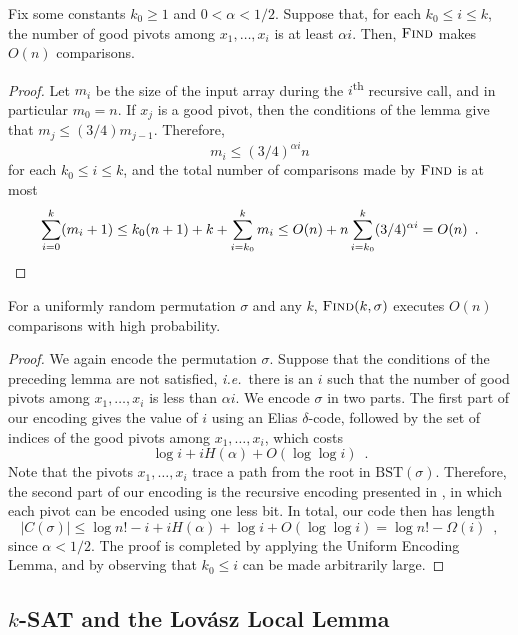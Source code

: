 \documentclass{patmorin}
\begin{document}
\begin{lem}
  Fix some constants $k_0 \geq 1$ and $0 < \alpha < 1/2$. Suppose
  that, for each $k_0 \leq i \leq k$, the number of good pivots among
  $x_1, \ldots, x_i$ is at least $\alpha i$. Then, $\textsc{Find}$
  makes $O(n)$ comparisons.
\end{lem}
\begin{proof}
  Let $m_i$ be the size of the input array during the
  $i$\textsuperscript{th} recursive call, and in particular $m_0 =
  n$. If $x_j$ is a good pivot, then the conditions of the lemma give
  that $m_j \le (3/4) m_{j - 1}$. Therefore,
  \[
  m_i \leq (3/4)^{\alpha i} n
  \]
  for each $k_0 \leq i \leq k$, and the total number of comparisons
  made by $\textsc{Find}$ is at most
  \[
  \sum_{i=0}^k (m_i + 1) \le k_0(n + 1) + k + \sum_{i=k_0}^k m_i \le
  O(n) + n \sum_{i = k_0}^k (3/4)^{\alpha i} = O(n) \enspace . \qedhere
  \]
\end{proof}

\begin{thm}
  For a uniformly random permutation $\sigma$ and any $k$,
  $\textsc{Find}(k, \sigma)$ executes $O(n)$ comparisons with high
  probability.
\end{thm}
\begin{proof}
  We again encode the permutation $\sigma$. Suppose that the
  conditions of the preceding lemma are not satisfied,
  \emph{i.e.}~there is an $i$ such that the number of good pivots
  among $x_1, \dots, x_i$ is less than $\alpha i$. We encode $\sigma$
  in two parts. The first part of our encoding gives the value of $i$
  using an Elias $\delta$-code, followed by the set of indices of the
  good pivots among $x_1, \dots, x_i$, which costs
  \[
  \log i + i H(\alpha) + O(\log \log i) \enspace .
  \]
  Note that the pivots $x_1, \dots, x_i$ trace a path from the root in
  $\text{BST}(\sigma)$. Therefore, the second part of our encoding is
  the recursive encoding presented in , in which each
  pivot can be encoded using one less bit. In total, our code then has
  length
  \[
    |C(\sigma)| \le \log n! - i + i H(\alpha) + \log i + O(\log \log
    i) = \log n! - \Omega(i) \enspace ,
  \]
  since $\alpha < 1/2$. The proof is completed by applying the Uniform
  Encoding Lemma, and by observing that $k_0 \leq i$ can be made
  arbitrarily large.
\end{proof}


\subsection{$k$-SAT and the Lov\'{a}sz Local Lemma}
\end{document}
